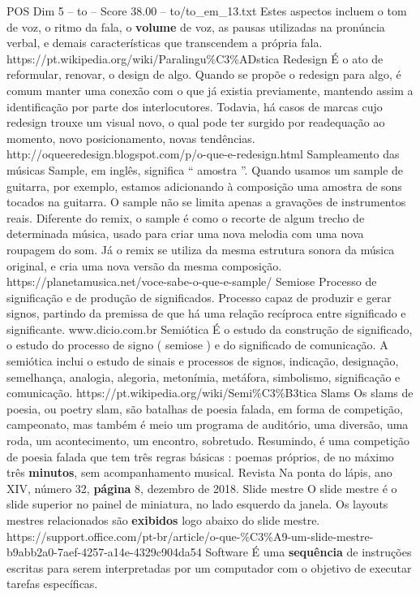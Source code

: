 \begin{textsample}{POS Dim 5 – to – Score 38.00 – to/to\_em\_13.txt}
Estes aspectos incluem o tom de voz, o ritmo da fala, o \textbf{volume} de voz, as pausas utilizadas na pronúncia verbal, e demais características que transcendem a própria fala. https://pt.wikipedia.org/wiki/Paralingu\%C3\%ADstica Redesign É o ato de reformular, renovar, o design de algo.
Quando se propõe o redesign para algo, é comum manter uma conexão com o que já existia previamente, mantendo assim a identificação por parte dos interlocutores.
Todavia, há casos de marcas cujo redesign trouxe um visual novo, o qual pode ter surgido por readequação ao momento, novo posicionamento, novas tendências. http://oqueeredesign.blogspot.com/p/o-que-e-redesign.html Sampleamento das músicas Sample, em inglês, significa “ amostra ”.
Quando usamos um sample de guitarra, por exemplo, estamos adicionando à composição uma amostra de sons tocados na guitarra.
O sample não se limita apenas a gravações de instrumentos reais.
Diferente do remix, o sample é como o recorte de algum trecho de determinada música, usado para criar uma nova melodia com uma nova roupagem do som.
Já o remix se utiliza da mesma estrutura sonora da música original, e cria uma nova versão da mesma composição. https://planetamusica.net/voce-sabe-o-que-e-sample/ Semiose Processo de significação e de produção de significados.
Processo capaz de produzir e gerar signos, partindo da premissa de que há uma relação recíproca entre significado e significante. www.dicio.com.br Semiótica É o estudo da construção de significado, o estudo do processo de signo ( semiose ) e do significado de comunicação.
A semiótica inclui o estudo de sinais e processos de signos, indicação, designação, semelhança, analogia, alegoria, metonímia, metáfora, simbolismo, significação e comunicação. https://pt.wikipedia.org/wiki/Semi\%C3\%B3tica Slams Os slams de poesia, ou poetry slam, são batalhas de poesia falada, em forma de competição, campeonato, mas também é meio um programa de auditório, uma diversão, uma roda, um acontecimento, um encontro, sobretudo.
Resumindo, é uma competição de poesia falada que tem três regras básicas : poemas próprios, de no máximo três \textbf{minutos}, sem acompanhamento musical.
Revista Na ponta do lápis, ano XIV, número 32, \textbf{página} 8, dezembro de 2018.
Slide mestre O slide mestre é o slide superior no painel de miniatura, no lado esquerdo da janela.
Os layouts mestres relacionados são \textbf{exibidos} logo abaixo do slide mestre. https://support.office.com/pt-br/article/o-que-\%C3\%A9-um-slide-mestre-b9abb2a0-7aef-4257-a14e-4329c904da54 Software É uma \textbf{sequência} de instruções escritas para serem interpretadas por um computador com o objetivo de executar tarefas específicas.

\end{textsample}
